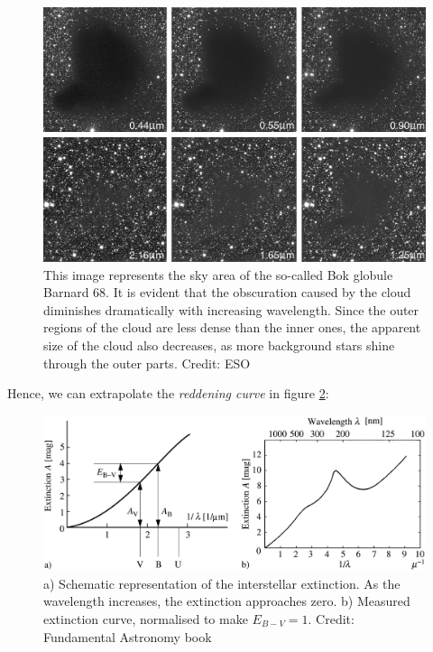 \documentclass[a4paper,11pt,twoside]{book}
\begin{document}
\begin{figure}[H]
	\centering
	\includegraphics[width=\linewidth]{images/barnard_68.jpg}
		\caption{This image represents the sky area of the so-called Bok globule Barnard 68. It is evident that the obscuration caused by the cloud diminishes dramatically with increasing wavelength. Since the outer regions of the cloud are less dense than the inner ones, the apparent size of the cloud also decreases, as more background stars shine through the outer parts.
		Credit: ESO}
	\label{fig:barnard_68_at_different_wls}
\end{figure}

Hence, we can extrapolate the \textit{reddening curve} in figure \ref{fig:reddening_curve}:

\begin{figure}[H]
	\centering
	\includegraphics[width=\linewidth]{images/reddening_curve.jpg}
	\caption{a) Schematic representation of the interstellar extinction. As the wavelength increases, the extinction approaches zero. b) Measured extinction curve,
		normalised to make $E_{B-V} = 1$.
		Credit: Fundamental Astronomy book}
	\label{fig:reddening_curve}
\end{figure}
\end{document}
